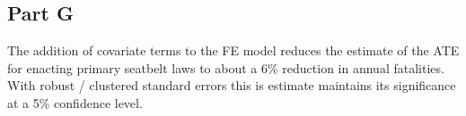 \documentclass[letterpaper, 12pt]{article}
\begin{document}
\subsection{Part G}

The addition of covariate terms to the FE model reduces the estimate of the ATE for enacting primary seatbelt laws to about a 6\% reduction in annual fatalities.  With robust / clustered standard errors this is estimate maintains its significance at a 5\% confidence level. 


\end{document}
